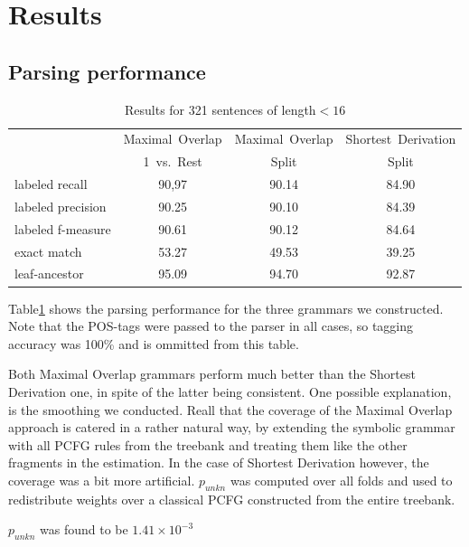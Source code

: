 \section{Results}\label{sec:Results}
\subsection{Parsing performance}

\begin{table}[t]
\begin{tabular}{l | ccc}
&Maximal~Overlap&Maximal~Overlap&Shortest~Derivation\\
& 1~vs.~Rest& Split&Split\\\hline
labeled recall&90,97&90.14&84.90\\
labeled precision&90.25&90.10&84.39\\
labeled f-measure&90.61&90.12&84.64\\
exact match&53.27&49.53&39.25\\
leaf-ancestor&95.09&94.70&92.87\\
\end{tabular}

\caption{Results for 321 sentences of length$<16$}
\label{t:performance16}
\end{table}

Table\ref{t:performance16} shows the parsing performance for the three grammars we constructed. Note that the POS-tags were passed to the parser in all cases, so tagging accuracy was 100\% and is ommitted from this table. %



Both Maximal Overlap grammars perform much better than the Shortest Derivation one, in spite of the latter being consistent. 
One possible explanation, is the smoothing we conducted. Reall that the coverage of the Maximal Overlap approach is catered in a rather natural way, by extending the symbolic grammar with all PCFG rules from the treebank and treating them like the other fragments in the estimation. In the case of Shortest Derivation however, the coverage was a bit more artificial. $p_{unkn}$ was computed over all folds and used to redistribute weights over a classical PCFG constructed from the entire treebank. 

$p_{unkn}$ was found to be $1.41\times 10^{-3}$%





